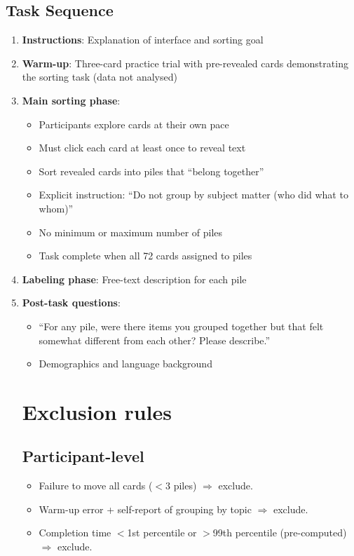 \documentclass[12pt]{article}
\begin{document}
\subsection{Task Sequence}
\begin{enumerate}
\item \textbf{Instructions}: Explanation of interface and sorting goal
\item \textbf{Warm-up}: Three-card practice trial with pre-revealed cards demonstrating the sorting task (data not analysed)
\item \textbf{Main sorting phase}:
\begin{itemize}
\item Participants explore cards at their own pace
\item Must click each card at least once to reveal text
\item Sort revealed cards into piles that ``belong together''
\item Explicit instruction: ``Do not group by subject matter (who did what to whom)''
\item No minimum or maximum number of piles
\item Task complete when all 72 cards assigned to piles
\end{itemize}
\item \textbf{Labeling phase}: Free-text description for each pile
\item \textbf{Post-task questions}:
\begin{itemize}
\item ``For any pile, were there items you grouped together but that felt somewhat different from each other? Please describe.''
\item Demographics and language background
\end{itemize}

\section{Exclusion rules}

\subsection{Participant-level}
\begin{itemize}
\item Failure to move all cards ($<$3 piles) $\Rightarrow$ exclude.
\item Warm-up error + self-report of grouping by topic $\Rightarrow$ exclude.
\item Completion time $<$1st percentile or $>$99th percentile (pre-computed) $\Rightarrow$ exclude.
\end{itemize}


\end{enumerate}
\end{document}
